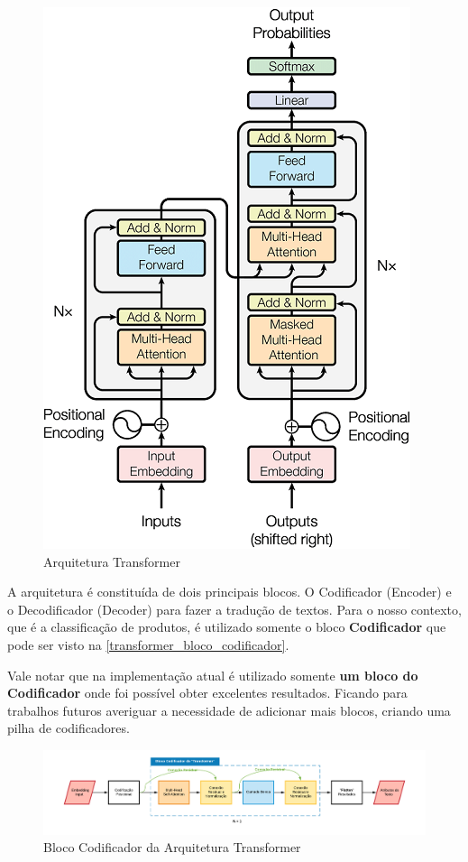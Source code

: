 \begin{figure}[]
	\caption{\label{transformer_architecture} Arquitetura Transformer}
	\begin{center}
	    \includegraphics[scale=0.5]{artigo/recursos/imagens/transformer_architecture.png}
	\end{center}
\end{figure}

A arquitetura é constituída de dois principais blocos. O Codificador (Encoder) e o Decodificador (Decoder) para fazer a tradução de textos. Para o nosso contexto, que é a classificação de produtos, é utilizado somente o bloco \textbf{Codificador} que pode ser visto na \autoref{transformer_bloco_codificador}.

Vale notar que na implementação atual é utilizado somente \textbf{um bloco do Codificador} onde foi possível obter excelentes resultados. Ficando para trabalhos futuros averiguar a necessidade de adicionar mais blocos, criando uma pilha de codificadores.

\begin{figure}[]
	\caption{\label{transformer_bloco_codificador} Bloco Codificador da Arquitetura Transformer}
	\begin{center}
	    \includegraphics[scale=0.5]{artigo/recursos/imagens/transformer_bloco_codificador.png}
	\end{center}
\end{figure}

